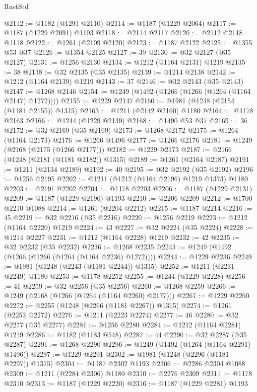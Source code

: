 \begin{lexlean}{RustStd}
\begin{coremodule}
@2112 := @1182 (@1291 @2110)
@2114 := @1187 (@1229 @2064)
@2117 := @1187 (@1229 @2091) @1193
@2118 := @2114 @2117
@2120 := @2112 @2118 @1118
@2122 := @1261 (@2109 @2120)
@2123 := @1187 @2122
@2125 := @1355 @53 @37
@2126 := @1354 @2125
@2127 := 39
@2130 := @32 @2127 (@35 @2127)
@2131 := @1256 @2130
@2134 := @1212 (@1164 @2131) @1219
@2135 := 38
@2138 := @32 @2135 (@35 @2135)
@2139 := @1214 @2138
@2142 := @1212 (@1164 @2139) @1219
@2143 := 37
@2146 := @32 @2143 (@35 @2143)
@2147 := @1268 @2146
@2154 := @1249 (@1492 (@1266 (@1266 (@1264 (@1164 @2147) @1272))))
@2155 := @1229 @2147
@2160 := @1981 (@1248 (@2154 (@1181 @2155)) @1315)
@2163 := @1211 (@2142 @2160) @1180
@2164 := @1178 @2163
@2166 := @1244 (@1229 @2139)
@2168 := @1490 @53 @37
@2169 := 36
@2172 := @32 @2169 (@35 @2169)
@2173 := @1268 @2172
@2175 := @1264 (@1164 @2173)
@2176 := @1266 @1496
@2177 := @1266 @2176
@2181 := @1249 (@2168 (@2175 (@1266 @2177)))
@2182 := @1229 @2173
@2187 := @2166 (@1248 (@2181 (@1181 @2182)) @1315)
@2189 := @1261 (@2164 @2187)
@2191 := @1211 (@2134 @2189)
@2192 := 40
@2195 := @32 @2192 (@35 @2192)
@2196 := @1256 @2195
@2202 := @1211 (@1212 (@1164 @2196) @1219 @1373) @1180
@2203 := @2191 @2202
@2204 := @1178 @2203
@2206 := @1187 (@1229 @2131)
@2209 := @1187 (@1229 @2196) @1193
@2210 := @2206 @2209
@2212 := @1700 @2210 @1088
@2214 := @1261 (@2204 @2212)
@2215 := @1187 @2214
@2216 := 45
@2219 := @32 @2216 (@35 @2216)
@2220 := @1256 @2219
@2223 := @1212 (@1164 @2220) @1219
@2224 := 43
@2227 := @32 @2224 (@35 @2224)
@2228 := @1214 @2227
@2231 := @1212 (@1164 @2228) @1219
@2232 := 42
@2235 := @32 @2232 (@35 @2232)
@2236 := @1268 @2235
@2243 := @1249 (@1492 (@1266 (@1266 (@1264 (@1164 @2236) @1272))))
@2244 := @1229 @2236
@2249 := @1981 (@1248 (@2243 (@1181 @2244)) @1315)
@2252 := @1211 (@2231 @2249) @1180
@2253 := @1178 @2252
@2255 := @1244 (@1229 @2228)
@2256 := 41
@2259 := @32 @2256 (@35 @2256)
@2260 := @1268 @2259
@2266 := @1249 (@2168 (@1266 (@1264 (@1164 @2260) @2177)))
@2267 := @1229 @2260
@2272 := @2255 (@1248 (@2266 (@1181 @2267)) @1315)
@2274 := @1261 (@2253 @2272)
@2276 := @1211 (@2223 @2274)
@2277 := 46
@2280 := @32 @2277 (@35 @2277)
@2281 := @1256 @2280
@2284 := @1212 (@1164 @2281) @1219
@2286 := @1182 (@1183 @548)
@2287 := 44
@2290 := @32 @2287 (@35 @2287)
@2291 := @1268 @2290
@2296 := @1249 (@1492 (@1264 (@1164 @2291) @1496))
@2297 := @1229 @2291
@2302 := @1981 (@1248 (@2296 (@1181 @2297)) @1315)
@2304 := @1187 @2302 @1193
@2306 := @2286 @2304 @1088
@2309 := @1211 (@2284 @2306) @1180
@2310 := @2276 @2309
@2311 := @1178 @2310
@2313 := @1187 (@1229 @2220)
@2316 := @1187 (@1229 @2281) @1193

\end{coremodule}
\end{lexlean}
